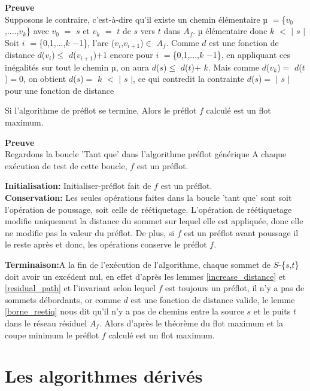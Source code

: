 \textbf{Preuve} \\
Supposons le contraire, c'est-à-dire qu'il existe un chemin élémentaire $µ$ $=$\{$v_0$,....,$v_k$\} avec $v_0$ $=$ $s$ et $v_k$ $=$ $t$ de $s$ vers $t$ dans $A_f$.
$µ$ élémentaire donc $k$ $<$ $|$ $s$ $|$
Soit $i$ $=$\{0,1,...,$k$ $-$1\}, l'arc ($v_i$,$v_{i+1}$)$\in$ $A_f$. Comme $d$ est une fonction de distance $d$($v_i$)$\leq$ $d$($v_{i+1}$)$+$1 encore pour $i$ $=$\{0,1,...,$k$ $-$1\}, en appliquant ces inégalités sur tout le chemin $µ$, on aura
$d$($s$)$\leq$ $d$($t$)$+$ $k$. Mais comme $d$($v_k$)$=$ $d$($t$)$=$0, on obtient 
$d$($s$)$=$ $k$ $<$ $|$ $s$ $|$, ce qui contredit la contrainte $d$($s$)$=$ $|$ $s$ $|$ pour une fonction de distance \\

\begin{thrm}
Si l'algorithme de préflot se termine, Alors le préflot $f$ calculé est un flot maximum.
\end{thrm}

\textbf{Preuve} \\
 Regardons la boucle 'Tant que' dans l'algorithme préflot générique A chaque exécution de test de cette boucle, $f$ est un préflot.
 
 \textbf{Initialisation:} Initialiser-préflot fait de $f$ est un préflot.\\ 
 
 \textbf{Conservation:} Les seules opérations faites dans la boucle 'tant que' sont soit l'opération
 de poussage, soit celle de réétiquetage.  
 L'opération de réétiquetage modifie uniquement la distance du sommet sur lequel elle est appliquée,
 donc elle ne modifie pas la valeur du préflot. De plus, si $f$ est un préflot avant poussage il le
 reste après et donc, les opérations conserve le préflot $f$.

 
 \textbf{Terminaison:}A la fin de l'exécution de l'algorithme, chaque sommet de
$S$-\{$s$,$t$\} doit avoir un excédent nul, en effet d'après les lemmes \ref{increase_distance} et
\ref{residual_path} et l'invariant selon lequel $f$ est toujours un préflot, il n'y a pas de sommets
débordants, or comme $d$ est une fonction de distance valide, le lemme \ref{borne_reetiq} nous dit
qu'il n'y a pas de chemins entre la source $s$ et le puits $t$ dans le réseau résiduel $A_f$.
 Alors d'après le théorème du flot maximum et la coupe minimum le préflot $f$ calculé est un flot maximum.  


\section{Les algorithmes dérivés}

